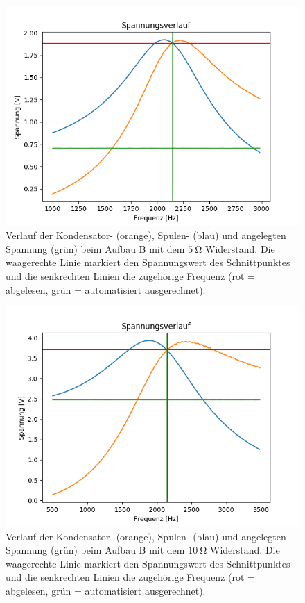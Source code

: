 \documentclass[12pt,a4paper]{article}
\begin{document}
\begin{figure}[H]
	\centering
	\includegraphics[scale=0.7]{Bilder/Serie_Spannungsueberhoehung_B_5.png}
	\caption{Verlauf der Kondensator- (orange), Spulen- (blau) und angelegten Spannung (grün) beim Aufbau B mit dem $\SI{5}{\ohm}$ Widerstand. Die waagerechte Linie markiert den Spannungswert des Schnittpunktes und die senkrechten Linien die zugehörige Frequenz (rot = abgelesen, grün = automatisiert ausgerechnet).}
	\label{fig:Serie_Spannungsueberhoehung_B_5}
\end{figure}
\begin{figure}[H]
	\centering
	\includegraphics[scale=0.7]{Bilder/Serie_Spannungsueberhoehung_B_10.png}
	\caption{Verlauf der Kondensator- (orange), Spulen- (blau) und angelegten Spannung (grün) beim Aufbau B mit dem $\SI{10}{\ohm}$ Widerstand. Die waagerechte Linie markiert den Spannungswert des Schnittpunktes und die senkrechten Linien die zugehörige Frequenz (rot = abgelesen, grün = automatisiert ausgerechnet).}
	\label{fig:Serie_Spannungsueberhoehung_B_10}
\end{figure}
\end{document}
